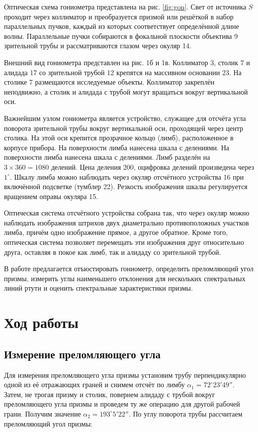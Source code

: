 \documentclass[12pt,a4paper]{article}
\begin{document}
 	Оптическая схема гониометра представлена на рис. \ref{fig:gon}. Свет от источника $S$ проходит через коллиматор и преобразуется призмой или решёткой в набор параллельных пучков, каждый из которых соответствует определённой длине волны. Параллельные пучки собираются в фокальной плоскости объектива 9 зрительной трубы и рассматриваются глазом через окуляр 14.
	
	Внешний вид гониометра представлен на рис. 1б и 1в. Коллиматор 3, столик 7 и алидада 17 со зрительной трубой 12 крепятся на массивном основании 23. На столике 7 размещаются исследуемые объекты. Коллиматор закреплён неподвижно, а столик и алидада с трубой могут вращаться вокруг вертикальной оси.
	
	Важнейшим узлом гониометра является устройство, служащее для отсчёта угла поворота зрительной трубы вокруг вертикальной оси, проходящей через центр столика. На этой оси крепится прозрачное кольцо (лимб), расположенное в корпусе прибора. На поверхности лимба нанесена шкала с делениями. На поверхности лимба нанесена шкала с делениями. Лимб разделён на $3 \times 360 = 1080$ делений. Цена деления 200, оцифровка делений произведена через $1^\circ$. Шкалу лимба можно наблюдать через окуляр отсчётного устройства 16 при включённой подсветке (тумблер 22). Резкость изображения шкалы регулируется вращением оправы окуляра 15.
	
	Оптическая система отсчётного устройства собрана так, что через окуляр можно наблюдать изображения штрихов двух диаметрально противоположных участков лимба, причём одно изображение прямое, а другое обратное. Кроме того, оптическая система позволяет перемещать эти изображения друг относительно друга, оставляя в покое как лимб, так и алидаду со зрительной трубой.
	
	В работе предлагается отъюстировать гониометр, определить преломляющий угол призмы, измерить углы наименьшего отклонения для нескольких спектральных линий ртути и оценить спектральные характеристики призмы.
	

    \section*{Ход работы}

    \subsection*{Измерение преломляющего угла}

	Для измерения преломляющего угла призмы установим трубу перпендикулярно одной из её отражающих граней и снимем отсчёт по лимбу $\alpha_1 = 72^\circ 23'49''$. Затем, не трогая призму и столик, повернем алидаду с трубой вокруг преломляющего угла призмы и проведем ту же операцию для другой рабочей грани. Получим значение $\alpha_2 = 193^\circ 5'22''$. По углу поворота трубы рассчитаем преломляющий угол призмы:
 
\end{document}
